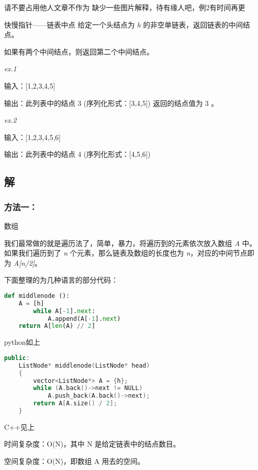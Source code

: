 

\begin{issues}
\issueDraft 请不要占用他人文章不作为
缺少一些图片解释，待有缘人吧，例2有时间再更
\end{issues}

\begin{example}{快慢指针——链表中点}
给定一个头结点为 \textsl{h} 的非空单链表，返回链表的中间结点。

如果有两个中间结点，则返回第二个中间结点。

\textsl{ex.1}

输入：[1,2,3,4,5] 

输出：此列表中的结点 3 (序列化形式：[3,4,5])
返回的结点值为 3 。

\textsl{ex.2}

输入：[1,2,3,4,5,6]

输出：此列表中的结点 4 (序列化形式：[4,5,6])
\end{example}

\subsection{解}
\subsubsection{方法一：}
数组

我们最常做的就是遍历法了，简单，暴力，将遍历到的元素依次放入数组 \textsl{A }中。如果我们遍历到了 \textsl{n }个元素，那么链表及数组的长度也为 \textsl{n}，对应的中间节点即为 \textsl{A[n/2]}。

下面整理的为几种语言的部分代码：
\begin{lstlisting}[language=python]
def middlenode ():
    A = [h]
        while A[-1].next:
            A.append(A[-1].next)
    return A[len(A) // 2]

\end{lstlisting}
python如上
\begin{lstlisting}[language=cpp]
public:
    ListNode* middlenode(ListNode* head) 
    {
        vector<ListNode*> A = {h};
        while (A.back()->next != NULL)
            A.push_back(A.back()->next);
        return A[A.size() / 2];
    }
\end{lstlisting}
C++见上

时间复杂度：O(N)，其中 N 是给定链表中的结点数目。

空间复杂度：O(N)，即数组 A 用去的空间。
